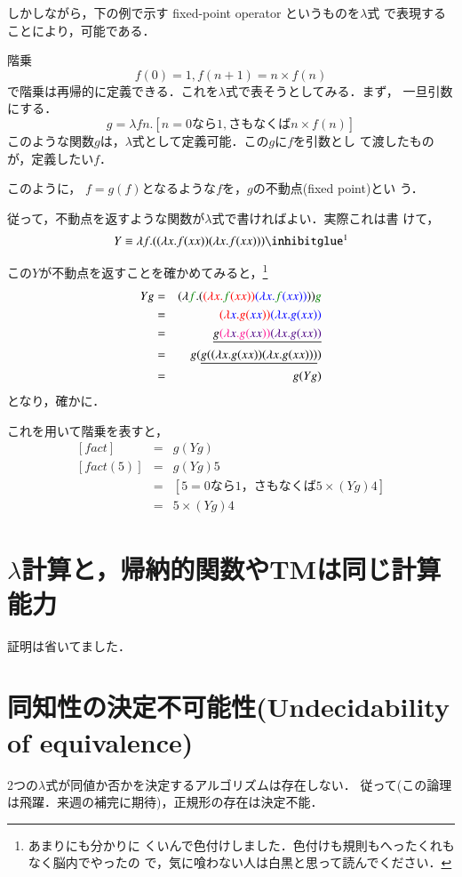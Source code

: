 しかしながら，下の例で示す fixed-point operator というものを$\lambda$式
で表現することにより，可能である．

\begin{myexample}{階乗}
 \[
  f(0) = 1 , f(n+1)  = n \times f(n)
 \]
 で階乗は再帰的に定義できる．これを$\lambda$式で表そうとしてみる．まず，
 一旦引数にする．
 \[
  g = \lambda fn . \left[n = 0 なら1, さもなくば n \times f(n)\right]
 \]
 このような関数$g$は，$\lambda$式として定義可能．この$g$に$f$を引数とし
 て渡したものが，定義したい$f$．

 このように， $f = g(f)$となるような$f$を，$g$の不動点(fixed point)とい
 う．

 従って，不動点を返すような関数が$\lambda$式で書ければよい．実際これは書
 けて，
 \[
  Y \equiv \lambda f . ((\lambda x . f(xx)) (\lambda x . f(xx))) \footnotemark
 \]
 
 この$Y$が不動点を返すことを確かめてみると，\footnote{あまりにも分かりに
 くいんで色付けしました．色付けも規則もへったくれもなく脳内でやったの
 で，気に喰わない人は白黒と思って読んでください．}
 \begin{eqnarray*}
  Yg &=& (\lambda \textcolor{Green}f . ( \textcolor{red}{(\lambda x . \textcolor{Green}{f}(xx))}
   \textcolor{blue}{(\lambda x . \textcolor{Green}{f}(xx))} )) \textcolor{Green}{g} \\
  &=& \textcolor{red}{(\lambda \textcolor{blue}{x} . g(\textcolor{blue}{xx}))} \textcolor{blue}{(\lambda x . g(xx))} \\
  &=& \underline{g\textcolor{DeepPink}{(\lambda \textcolor{Indigo}{x} . g(\textcolor{Indigo}{xx}))} \textcolor{Indigo}{(\lambda x . g(xx))}} \\
  &=& g( \underline{g((\lambda x . g(xx))(\lambda x . g(xx)))}) \\ 
  &=& g(Yg)
 \end{eqnarray*}
 となり，確かに．

 これを用いて階乗を表すと，
 \begin{eqnarray*}
  \left[fact\right] &=& g(Yg) \\
  \left[fact(5)\right] &=& g(Yg) 5 \\
  &=& \left[5 = 0 なら1，さもなくば 5 \times (Yg) 4\right] \\
  &=& 5 \times (Yg)4
 \end{eqnarray*}
\end{myexample}

\section{$\lambda$計算と，帰納的関数やTMは同じ計算能力}
証明は省いてました．

\section{同知性の決定不可能性(Undecidability of equivalence)}
2つの$\lambda$式が同値か否かを決定するアルゴリズムは存在しない．
従って(この論理は飛躍．来週の補完に期待)，正規形の存在は決定不能．

